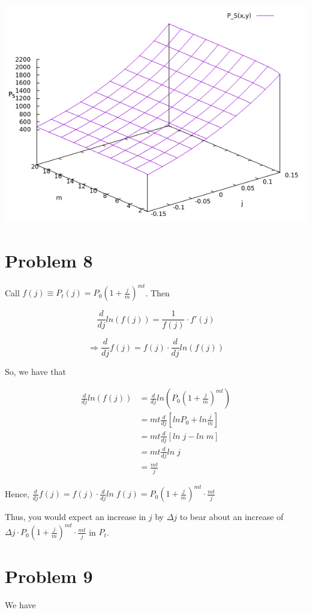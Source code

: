 \documentclass[12pt]{article}
\begin{document}
\begin{center}
	\includegraphics[scale=0.5]{screenshot2.png}
\end{center}

\section*{Problem 8}
Call $f(j) \equiv P_t(j) = P_0(1+\frac{j}{m})^{mt}$. Then 

\newcommand{\dv}[1]{\frac{d}{d#1}}

$$\dv j ln(f(j))=\frac{1}{f(j)}\cdot f'(j)$$

$$\Rightarrow \dv j f(j) = f(j)\cdot \dv{j}ln(f(j))$$

So, we have that

\begin{align*}
\dv j ln(f(j)) &= \dv j ln(P_0(1+\frac{j}{m})^{mt}) \\
	&= mt \dv j [ln P_0 + ln\frac{j}{m}] \\
	&= mt\dv j[ln\; j - ln\; m]\\
	&= mt\dv j ln\; j\\
	&= \frac{mt}{j}
\end{align*}

Hence, $\dv j f(j) = f(j)\cdot \dv j ln\; f(j) = P_0(1+\frac{j}{m})^{mt}\cdot \frac{mt}{j}$

Thus, you would expect an increase in $j$ by $\Delta j$ to
bear about an increase of $\Delta j\cdot P_0(1+\frac{j}{m})^{mt}\cdot \frac{mt}{j}$ in $P_t$.

\section*{Problem 9}
We have
\end{document}
